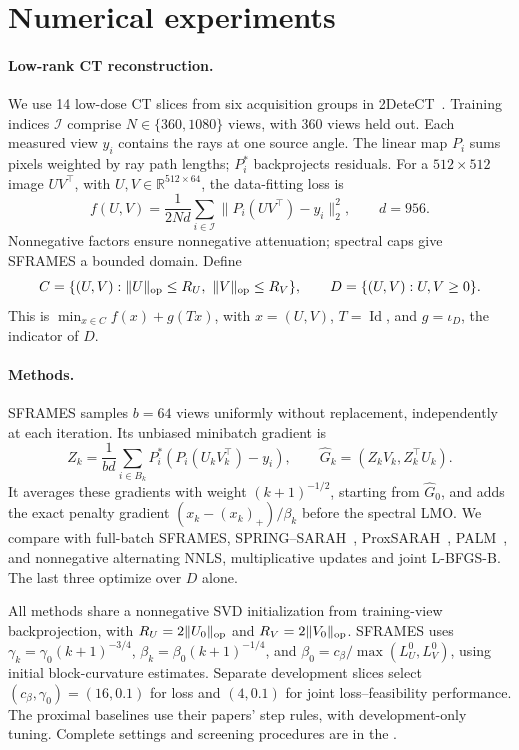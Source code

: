 \section{Numerical experiments}
\label{sec:ct-experiments}
\paragraph{Low-rank CT reconstruction.}
We use 14 low-dose CT slices from six acquisition groups in 2DeteCT~\cite{detect}.
Training indices \(\mathcal I\) comprise \(N\in\{360,1080\}\) views, with 360 views held out.
Each measured view \(y_i\) contains the rays at one source angle. The linear map
\(P_i\) sums pixels weighted by ray path lengths; \(P_i^\ast\) backprojects residuals.
For a \(512\times512\) image \(UV^\top\), with
\(U,V\in\mathbb R^{512\times64}\), the data-fitting loss is
\begin{equation}
 f(U,V)=\frac{1}{2Nd}\sum_{i\in\mathcal I}
       \|P_i(UV^\top)-y_i\|_2^2,\qquad d=956.
 \label{eq:ct-loss}
\end{equation}
Nonnegative factors ensure nonnegative attenuation; spectral caps give
SFRAMES a bounded domain. Define
\[
 C=\{(U,V):\|U\|_{\rm op}\le R_U,\ \|V\|_{\rm op}\le R_V\},
 \qquad D=\{(U,V):U,V\ge0\}.
\]
This is \(\min_{x\in C}f(x)+g(Tx)\), with \(x=(U,V)\),
\(T=\operatorname{Id}\), and \(g=\iota_D\), the indicator of \(D\).

\paragraph{Methods.}
SFRAMES samples \(b=64\) views uniformly without replacement, independently
at each iteration. Its unbiased minibatch gradient is
\[
 Z_k=\frac1{bd}\sum_{i\in B_k}P_i^\ast(P_i(U_kV_k^\top)-y_i),
 \qquad \widehat G_k=(Z_kV_k,Z_k^\top U_k).
\]
It averages these gradients with weight \((k+1)^{-1/2}\), starting from
\(\widehat G_0\), and adds the exact penalty gradient
\((x_k-(x_k)_+)/\beta_k\) before the spectral LMO.
We compare with full-batch SFRAMES, SPRING--SARAH~\cite{spring},
ProxSARAH~\cite{proxsarah}, PALM~\cite{palm}, and nonnegative alternating
NNLS, multiplicative updates and joint L-BFGS-B. The last three optimize
over \(D\) alone.

All methods share a nonnegative SVD initialization from training-view
backprojection, with \(R_U=2\|U_0\|_{\rm op}\) and
\(R_V=2\|V_0\|_{\rm op}\). SFRAMES uses
\(\gamma_k=\gamma_0(k+1)^{-3/4}\), \(\beta_k=\beta_0(k+1)^{-1/4}\), and
\(\beta_0=c_\beta/\max(L_U^0,L_V^0)\), using initial block-curvature estimates.
Separate development slices select
\((c_\beta,\gamma_0)=(16,0.1)\) for loss and \((4,0.1)\) for joint loss--feasibility performance.
The proximal baselines use their papers' step rules, with development-only
tuning. Complete settings and screening procedures are in the \CTReproducibility{}.

